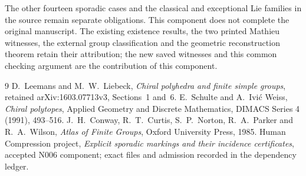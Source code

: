 \documentclass[11pt,a4paper]{article}
\begin{document}
The other fourteen sporadic cases and the classical and exceptional
Lie families in the source remain separate obligations. This component
does not complete the original manuscript. The existing existence
results, the two printed Mathieu witnesses, the external group
classification and the geometric reconstruction theorem retain their
attribution; the new saved witnesses and this common checking argument
are the contribution of this component.

\begin{thebibliography}{9}
 D.~Leemans and M.~W.~Liebeck, \emph{Chiral polyhedra and
finite simple groups}, retained arXiv:1603.07713v3, Sections~1 and~6.
 E.~Schulte and A.~Ivi\'c Weiss, \emph{Chiral polytopes},
Applied Geometry and Discrete Mathematics, DIMACS Series 4 (1991), 493--516.
 J.~H.~Conway, R.~T.~Curtis, S.~P.~Norton, R.~A.~Parker
and R.~A.~Wilson, \emph{Atlas of Finite Groups}, Oxford University Press, 1985.
 Human Compression project, \emph{Explicit sporadic
markings and their incidence certificates}, accepted N006 component;
exact files and admission recorded in the dependency ledger.
\end{thebibliography}
\end{document}
